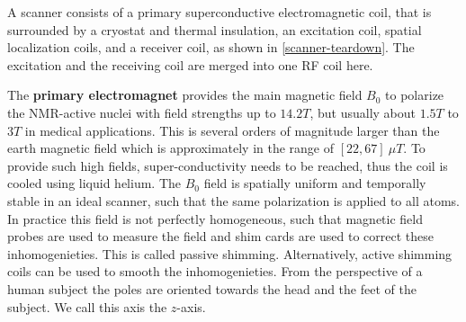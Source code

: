 A scanner consists of a primary superconductive electromagnetic coil, that is surrounded by a cryostat and thermal insulation, an excitation coil, spatial localization coils, and a receiver coil, as shown in \ref{scanner-teardown}.
The excitation and the receiving coil are merged into one RF coil here. \\

The \textbf{primary electromagnet} provides the main magnetic field $B_0$ to polarize the NMR-active nuclei with field strengths up to $14.2 T$, but usually about $1.5 T$ to $3 T$ in medical applications.
This is several orders of magnitude larger than the earth magnetic field which is approximately in the range of $[22, 67] \ \mu T$.
To provide such high fields, super-conductivity needs to be reached, thus the coil is cooled using liquid helium.
The $B_0$ field is spatially uniform and temporally stable in an ideal scanner, such that the same polarization is applied to all atoms.
In practice this field is not perfectly homogeneous, such that magnetic field probes are used to measure the field and shim cards are used to correct these inhomogenieties.
This is called passive shimming.
Alternatively, active shimming coils can be used to smooth the inhomogenieties.
From the perspective of a human subject the poles are oriented towards the head and the feet of the subject.
We call this axis the $z$-axis. \\

